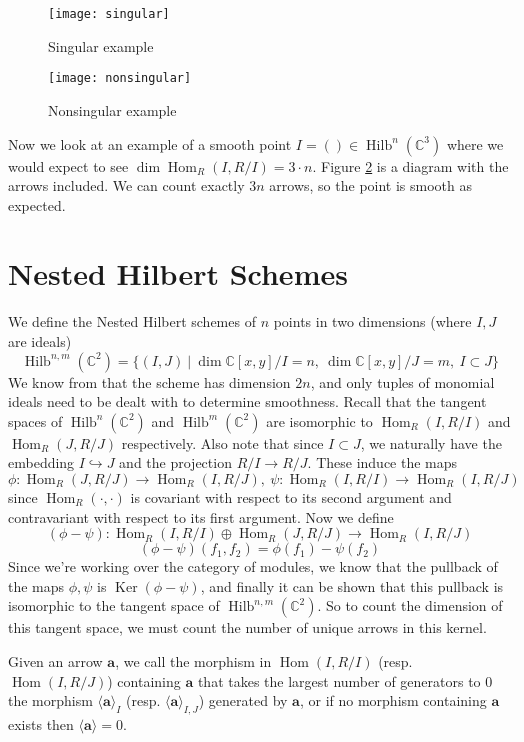 \documentclass[a4page]{article}
\def\Ker{\operatorname{Ker}}
\def\Hilb{\operatorname{Hilb}}
\def\Hom{\operatorname{Hom}}
\theoremstyle{definition}
\begin{document}
\begin{figure}
\centering
\texttt{[image: singular]}
\caption{Singular example}
\label{fig:singular}
\end{figure}

\begin{figure}
\centering
\texttt{[image: nonsingular]}
\caption{Nonsingular example}
\label{fig:nonsingular}
\end{figure}
Now we look at an example of a smooth point $ I = () \in  \Hilb^{n}(\mathbb{C}^{3}) $ where we would expect to see $ \dim \Hom_{R}(I,R/I) = 3 \cdot n $.
Figure \ref{fig:nonsingular} is a diagram with the arrows included.
We can count exactly $3n$ arrows, so the point is smooth as expected.

\section{Nested Hilbert Schemes}
We define the Nested Hilbert schemes of $n$ points in two dimensions (where $I,J$ are ideals)
$$ \Hilb^{n,m}(\mathbb{C}^{2}) = \{ (I,J) \ | \ \dim \mathbb{C}[x,y]/I = n, \ \dim \mathbb{C}[x,y]/J = m, \ I \subset J  \} $$
We know from \cite{nested_schemes} that the scheme has dimension $2n$, and only tuples of monomial ideals need to be dealt with to determine smoothness.
Recall that the tangent spaces of $\Hilb^{n}(\mathbb{C}^{2}) $ and $\Hilb^{m}(\mathbb{C}^{2}) $ are isomorphic to $\Hom_{R}(I,R/I)$ and $\Hom_{R}(J,R/J)$ respectively.
Also note that since $I \subset J$, we naturally have the embedding $ I \hookrightarrow J $ and the projection $ R/I \to R/J $.
These induce the maps 
$$ \phi: \Hom_{R}(J,R/J) \to \Hom_{R}(I,R/J), \ \psi: \Hom_{R}(I,R/I) \to \Hom_{R}(I,R/J) $$ since $\Hom_{R}(\cdot,\cdot)$ is covariant with respect to its second argument and contravariant with respect to its first argument.
Now we define $$ (\phi - \psi):\Hom_{R}(I,R/I) \oplus \Hom_{R}(J,R/J) \to \Hom_{R}(I,R/J) $$ $$ (\phi - \psi)(f_{1},f_{2}) = \phi(f_{1}) - \psi(f_{2}) $$ Since we're working over the category of modules, we know that the pullback of the maps $ \phi, \psi $ is $\Ker(\phi - \psi) $, and finally it can be shown that this pullback is isomorphic to the tangent space of $ \Hilb^{n,m}(\mathbb{C}^{2}) $.
So to count the dimension of this tangent space, we must count the number of unique arrows in this kernel.

Given an arrow $\mathbf a$, we call the morphism in $\Hom(I,R/I)$ (resp. $\Hom(I,R/J)$) containing $\mathbf a$ that takes the largest number of generators to $0$ the morphism $\langle \mathbf a \rangle_I$
(resp. $\langle \mathbf a \rangle_{I,J}$) generated by $\mathbf a$, or if no morphism containing $\mathbf a$ exists then $\langle \mathbf a \rangle = 0$.
\end{document}
